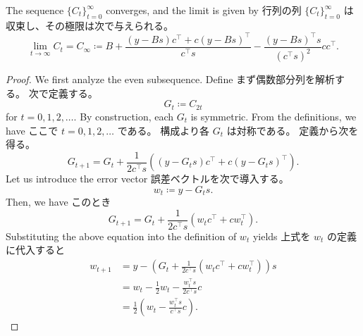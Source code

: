 \documentclass[0_main]{subfiles}
\begin{document}
\begin{proposition}\label{prop:psb-convergence}
    \ifEn
        The sequence $\{ C_{t} \}_{t=0}^{\infty}$ converges, and the limit is given by
    \else
        行列の列 $\{ C_{t} \}_{t=0}^{\infty}$ は収束し、その極限は次で与えられる。
    \fi
    \begin{equation*}
        \lim_{t \to \infty} C_{t}
        =
        C_{\infty}
        \coloneqq
        B + \frac{(y - Bs)c^\top + c(y - Bs)^\top}{c^\top s} - \frac{(y - Bs)^\top s}{(c^\top s)^2} c c^\top.
    \end{equation*}
\end{proposition}
\begin{proof}
    \ifEn
        We first analyze the even subsequence.
        Define
    \else
        まず偶数部分列を解析する。
        次で定義する。
    \fi
    \begin{equation*}
        G_t \coloneqq C_{2t}
    \end{equation*}
    \ifEn
        for $t=0,1,2,\dots$.
        By construction, each $G_t$ is symmetric.
        From the definitions, we have
    \else
        ここで $t=0,1,2,\dots$ である。
        構成より各 $G_t$ は対称である。
        定義から次を得る。
    \fi
    \begin{equation*}
        G_{t+1} = G_t +\frac{1}{2c^\top s}\left((y-G_t s)c^\top+c(y-G_t s)^\top\right).
    \end{equation*}
    \ifEn
        Let us introduce the error vector
    \else
        誤差ベクトルを次で導入する。
    \fi
    \begin{equation*}
        w_t \coloneqq y-G_t s.
    \end{equation*}
    \ifEn
        Then, we have
    \else
        このとき
    \fi
    \begin{equation*}
        G_{t+1} = G_t+\frac{1}{2c^\top s}(w_t c^\top+cw_t^\top).
    \end{equation*}
    \ifEn
        Substituting the above equation into the definition of $w_t$ yields
    \else
        上式を $w_t$ の定義に代入すると
    \fi
    \begin{align*}
        w_{t+1} & = y-\left(G_t+\frac{1}{2c^\top s}(w_t c^\top+cw_t^\top)\right)s \\
                & =
        w_t-\frac12w_t-\frac{w_t^\top s}{2c^\top s}c                              \\
                & =
        \frac{1}{2}\left(w_t-\frac{w_t^\top s}{c^\top s}c\right).

\end{align*}
\end{proof}
\end{document}
